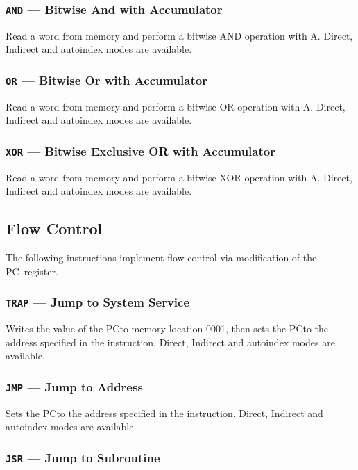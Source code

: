 \documentclass[11pt,a4paper,twocolumns]{article}
\newcommand\hex[1]{\textsf{#1}}
\newcommand\register[1]{\textsf{#1}}
\newcommand\PC{\register{PC}}
\begin{document}
\subsubsection{{\tt AND} — Bitwise And with Accumulator}
\label{sec-and}

Read a word from memory and perform a bitwise AND operation with A. Direct, Indirect and autoindex
modes are available.

\subsubsection{{\tt OR} — Bitwise Or with Accumulator}
\label{sec-or}

Read a word from memory and perform a bitwise OR operation with A. Direct, Indirect and autoindex
modes are available.

\subsubsection{{\tt XOR} — Bitwise Exclusive OR with Accumulator}
\label{sec-xor}

Read a word from memory and perform a bitwise XOR operation with A. Direct, Indirect and autoindex
modes are available.

\subsection{Flow Control}

The following instructions implement flow control via modification of the \PC\ register.

\subsubsection{{\tt TRAP} — Jump to System Service}
\label{sec-trap}

Writes the value of the \PC to memory location \hex{0001}, then sets
the \PC to the address specified in the instruction. Direct, Indirect
and autoindex modes are available.

\subsubsection{{\tt JMP} — Jump to Address}
\label{sec-jmp}

Sets the \PC to the address specified in the instruction. Direct,
Indirect and autoindex modes are available.

\subsubsection{{\tt JSR} — Jump to Subroutine}
\label{sec-jsr}
\end{document}
